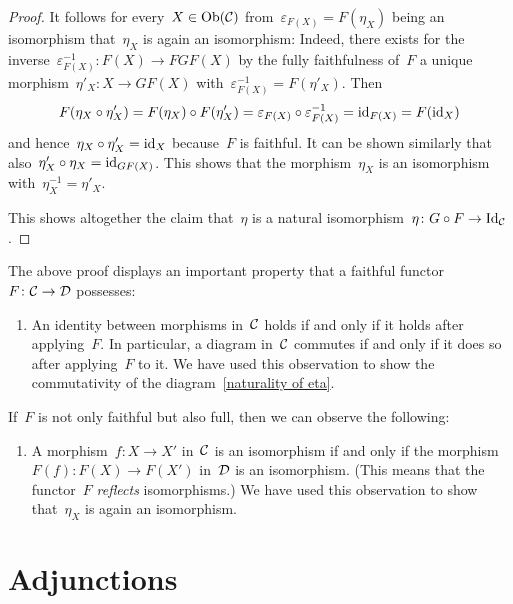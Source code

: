 \begin{proof}
  It follows for every~$X \in \operatorname{Ob}(\mathcal{C})$ from~$\varepsilon_{F(X)} = F(\eta_X)$ being an isomorphism that~$\eta_X$ is again an isomorphism:
  Indeed, there exists for the inverse~$\varepsilon_{F(X)}^{-1} \colon F(X) \to FGF(X)$ by the fully faithfulness of~$F$ a unique morphism~$\eta'_X \colon X \to GF(X)$ with~$\varepsilon_{F(X)}^{-1} = F(\eta'_X)$.
  Then
  \[
      F(\eta_X \circ \eta'_X)
    = F(\eta_X) \circ F(\eta'_X)
    = \varepsilon_{F(X)} \circ \varepsilon_{F(X)}^{-1}
    = \mathrm{id}_{F(X)}
    = F(\mathrm{id}_X)
  \]
  and hence~$\eta_X \circ \eta'_X = \mathrm{id}_X$ because~$F$ is faithful.
  It can be shown similarly that also~$\eta'_X \circ \eta_X = \mathrm{id}_{GF(X)}$.
  This shows that the morphism~$\eta_X$ is an isomorphism with~$\eta_X^{-1} = \eta'_X$.
  
  This shows altogether the claim that~$\eta$ is a natural isomorphism~$\eta \colon G \circ F \to \mathrm{Id}_{\mathcal{C}}$.
\end{proof}


\begin{remark*}
  The above proof displays an important property that a faithful functor~$F \colon \mathcal{C} \to \mathcal{D}$ possesses:
  \begin{enumerate}
    \item
      An identity between morphisms in~$\mathcal{C}$ holds if and only if it holds after applying~$F$.
      In particular, a diagram in~$\mathcal{C}$ commutes if and only if it does so after applying~$F$ to it.
      We have used this observation to show the commutativity of the diagram~\eqref{naturality of eta}.
  \end{enumerate}
  If~$F$ is not only faithful but also full, then we can observe the following:
  \begin{enumerate}[resume]
    \item
      A morphism~$f \colon X \to X'$ in~$\mathcal{C}$ is an isomorphism if and only if the morphism~$F(f) \colon F(X) \to F(X')$ in~$\mathcal{D}$ is an isomorphism.
      (This means that the functor~$F$ \emph{reflects} isomorphisms.)
      We have used this observation to show that~$\eta_X$ is again an isomorphism.
  \end{enumerate}
\end{remark*}





\section{Adjunctions}


